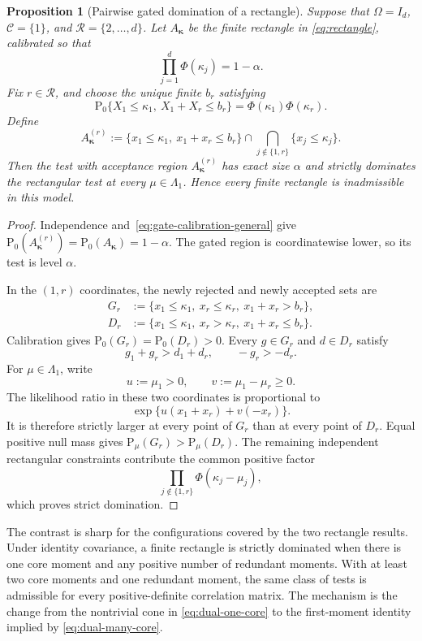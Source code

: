 \documentclass[12pt]{article}
\newtheorem{proposition}[theorem]{Proposition}
\theoremstyle{definition}
\theoremstyle{remark}
\newcommand{\Pp}{\mathrm P}
\newcommand{\cC}{\mathcal C}
\newcommand{\cR}{\mathcal R}
\newcommand{\1}{\mathbf 1}
\begin{document}
\begin{proposition}[Pairwise gated domination of a rectangle]
\label{prop:gated-rectangle}
Suppose that $\Omega=I_d$, $\cC=\{1\}$, and
$\cR=\{2,\ldots,d\}$.  Let $A_{\bm\kappa}$ be the finite rectangle in
\eqref{eq:rectangle}, calibrated so that
\[
\prod_{j=1}^d\Phi(\kappa_j)=1-\alpha.
\]
Fix $r\in\cR$, and choose the unique finite $b_r$ satisfying
\begin{equation}\label{eq:gate-calibration-general}
\Pp_0\{X_1\le\kappa_1,\ X_1+X_r\le b_r\}
=
\Phi(\kappa_1)\Phi(\kappa_r).
\end{equation}
Define
\begin{equation}\label{eq:gated-rectangle-general}
A_{\bm\kappa}^{(r)}
:=
\{x_1\le\kappa_1,\ x_1+x_r\le b_r\}
\cap
\bigcap_{j\notin\{1,r\}}\{x_j\le\kappa_j\}.
\end{equation}
Then the test with acceptance region $A_{\bm\kappa}^{(r)}$ has exact size
$\alpha$ and strictly dominates the rectangular test at every
$\mu\in\Lambda_1$.  Hence every finite rectangle is inadmissible in this
model.
\end{proposition}

\begin{proof}
Independence and~\eqref{eq:gate-calibration-general} give
$\Pp_0(A_{\bm\kappa}^{(r)})=\Pp_0(A_{\bm\kappa})=1-\alpha$.
The gated region is coordinatewise lower, so its test is level $\alpha$.

In the $(1,r)$ coordinates, the newly rejected and newly accepted sets are
\begin{align*}
G_r
&:=\{x_1\le\kappa_1,\ x_r\le\kappa_r,\ x_1+x_r>b_r\},\\
D_r
&:=\{x_1\le\kappa_1,\ x_r>\kappa_r,\ x_1+x_r\le b_r\}.
\end{align*}
Calibration gives $\Pp_0(G_r)=\Pp_0(D_r)>0$.  Every $g\in G_r$ and
$d\in D_r$ satisfy
\[
g_1+g_r>d_1+d_r,
\qquad
-g_r>-d_r.
\]
For $\mu\in\Lambda_1$, write
\[
u:=\mu_1>0,
\qquad
v:=\mu_1-\mu_r\ge0.
\]
The likelihood ratio in these two coordinates is proportional to
\[
\exp\{u(x_1+x_r)+v(-x_r)\}.
\]
It is therefore strictly larger at every point of $G_r$ than at every point
of $D_r$.  Equal positive null mass gives
$\Pp_\mu(G_r)>\Pp_\mu(D_r)$.  The remaining independent rectangular
constraints contribute the common positive factor
\[
\prod_{j\notin\{1,r\}}\Phi(\kappa_j-\mu_j),
\]
which proves strict domination.
\end{proof}

The contrast is sharp for the configurations covered by the two rectangle
results.  Under identity covariance, a finite rectangle is strictly dominated
when there is one core moment and any positive number of redundant moments.
With at least two core moments and one redundant moment, the same class of
tests is admissible for every positive-definite correlation matrix.  The
mechanism is the change from the nontrivial cone in
\eqref{eq:dual-one-core} to the first-moment identity implied by
\eqref{eq:dual-many-core}.
\end{document}

